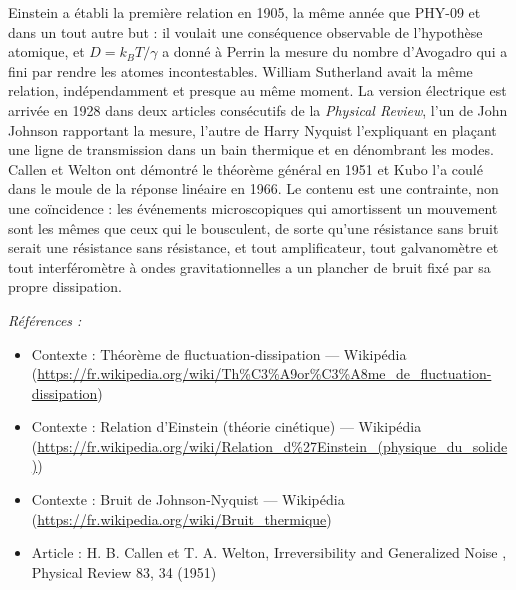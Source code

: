 \documentclass[11pt]{article}
\newenvironment{refs}{\par\small\noindent\emph{Références :}\begin{itemize}\setlength\itemsep{0pt}}{\end{itemize}\normalsize}
\begin{document}
\noindent Einstein a établi la première relation en 1905, la même année que PHY-09 et
dans un tout autre but : il voulait une conséquence observable de l'hypothèse atomique, et
$D = k_B T/\gamma$ a donné à Perrin la mesure du nombre d'Avogadro qui a fini par rendre les
atomes incontestables. William Sutherland avait la même relation, indépendamment et presque au
même moment. La version électrique est arrivée en 1928 dans deux articles consécutifs de la
\textit{Physical Review}, l'un de John Johnson rapportant la mesure, l'autre de Harry Nyquist
l'expliquant en plaçant une ligne de transmission dans un bain thermique et en dénombrant les
modes. Callen et Welton ont démontré le théorème général en 1951 et Kubo l'a coulé dans le moule
de la réponse linéaire en 1966. Le contenu est une contrainte, non une coïncidence : les
événements microscopiques qui amortissent un mouvement sont les mêmes que ceux qui le bousculent,
de sorte qu'une résistance sans bruit serait une résistance sans résistance, et tout
amplificateur, tout galvanomètre et tout interféromètre à ondes gravitationnelles a un plancher de
bruit fixé par sa propre dissipation.

\begin{refs}
\item Contexte : Théorème de fluctuation-dissipation --- Wikipédia (\url{https://fr.wikipedia.org/wiki/Th%C3%A9or%C3%A8me_de_fluctuation-dissipation})
\item Contexte : Relation d'Einstein (théorie cinétique) --- Wikipédia (\url{https://fr.wikipedia.org/wiki/Relation_d%27Einstein_(physique_du_solide)})
\item Contexte : Bruit de Johnson-Nyquist --- Wikipédia (\url{https://fr.wikipedia.org/wiki/Bruit_thermique})
\item Article : H. B. Callen et T. A. Welton, \og{} Irreversibility and Generalized Noise \fg{}, Physical Review 83, 34 (1951)
\end{refs}

\bigskip
\end{document}
